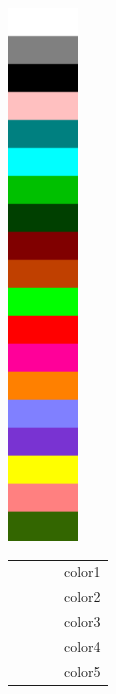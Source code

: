 \begin{figure}[!htb]
	\noindent
	\begin{minipage}{0.5\textwidth}	
		\hfill
		\includegraphics[height=14.1cm]{colorbar.png}%
		\hspace{1cm}
	\end{minipage}%
	\hfill%
	\begin{minipage}{0.5\textwidth}
		\begin{tabular}{p{1.5cm} p{1cm} p{1.5cm} p{1cm}}
          \cellcolor[rgb]{1.00000,1.00000,1.00000}{~} & ~ & \cellcolor[cmyk]{0.00000,0.00060,0.00027,0.00014}{~} & {color1} \\
          \cellcolor[rgb]{0.50196,0.50196,0.50196}{~} & ~ & \cellcolor[cmyk]{0.24808,0.20929,0.19661,0.36100}{~} & {color2} \\
          \cellcolor[rgb]{0.00000,0.00000,0.00000}{~} & ~ & \cellcolor[cmyk]{0.00000,0.00000,0.00000,0.99997}{~} & {color3} \\
          \cellcolor[rgb]{1.00000,0.75294,0.75294}{~} & ~ & \cellcolor[cmyk]{0.00482,0.36851,0.22217,0.00104}{~} & {color4} \\
          \cellcolor[rgb]{0.00000,0.50196,0.50196}{~} & ~ & \cellcolor[cmyk]{0.83091,0.21785,0.40542,0.07037}{~} & {color5} \\

\end{tabular}
\end{minipage}
\end{figure}
